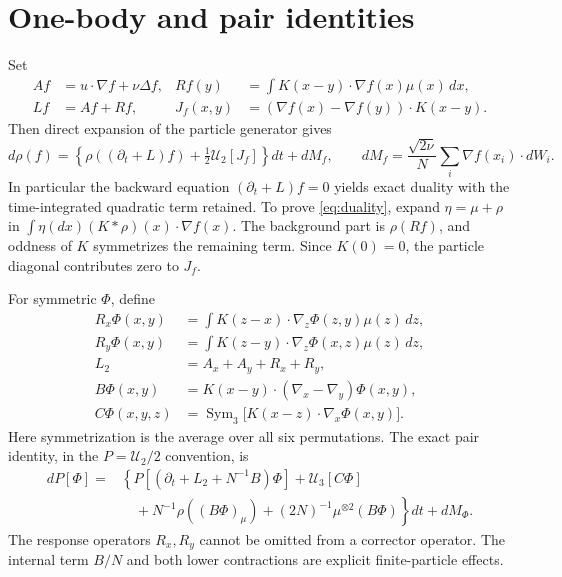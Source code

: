 \documentclass[11pt]{article}
\newcommand{\U}{\mathcal U}
\begin{document}
\section{One-body and pair identities}
Set
\begin{align*}
 Af&=u\cdot\nabla f+\nu\Delta f, &
 Rf(y)&=\int K(x-y)\cdot\nabla f(x)\mu(x)\,dx,\\
 Lf&=Af+Rf, &
 J_f(x,y)&=(\nabla f(x)-\nabla f(y))\cdot K(x-y).
\end{align*}
Then direct expansion of the particle generator gives
\begin{equation}\label{eq:duality}
 d\rho(f)=\left\{\rho((\partial_t+L)f)+\tfrac12\U_2[J_f]\right\}dt+dM_f,
 \qquad dM_f=\frac{\sqrt{2\nu}}N\sum_i\nabla f(x_i)\cdot dW_i.
\end{equation}
In particular the backward equation $(\partial_t+L)f=0$ yields
exact duality with the time-integrated quadratic term retained.
To prove \eqref{eq:duality}, expand $\eta=\mu+\rho$ in
$\int\eta(dx)(K*\rho)(x)\cdot\nabla f(x)$.
The background part is $\rho(Rf)$, and oddness of $K$ symmetrizes
the remaining term. Since $K(0)=0$, the particle diagonal contributes
zero to $J_f$.

For symmetric $\Phi$, define
\begin{align*}
 R_x\Phi(x,y)&=\int K(z-x)\cdot\nabla_z\Phi(z,y)\mu(z)\,dz,\\
 R_y\Phi(x,y)&=\int K(z-y)\cdot\nabla_z\Phi(x,z)\mu(z)\,dz,\\
 L_2&=A_x+A_y+R_x+R_y,\\
 B\Phi(x,y)&=K(x-y)\cdot(\nabla_x-\nabla_y)\Phi(x,y),\\
 C\Phi(x,y,z)&=\operatorname{Sym}_3\big[K(x-z)\cdot\nabla_x\Phi(x,y)\big].
\end{align*}
Here symmetrization is the average over all six permutations. The exact
pair identity, in the $P=\U_2/2$ convention, is
\begin{equation}\label{eq:pair}
\begin{split}
 dP[\Phi]={}&\left\{P[(\partial_t+L_2+N^{-1}B)\Phi]+\U_3[C\Phi]\right.\\
 &\left.\quad+N^{-1}\rho((B\Phi)_\mu)
          +(2N)^{-1}\mu^{\otimes2}(B\Phi)\right\}dt+dM_\Phi.
\end{split}
\end{equation}
The response operators $R_x,R_y$ cannot be omitted from a corrector
operator. The internal term $B/N$ and both lower contractions are
explicit finite-particle effects.
\end{document}
